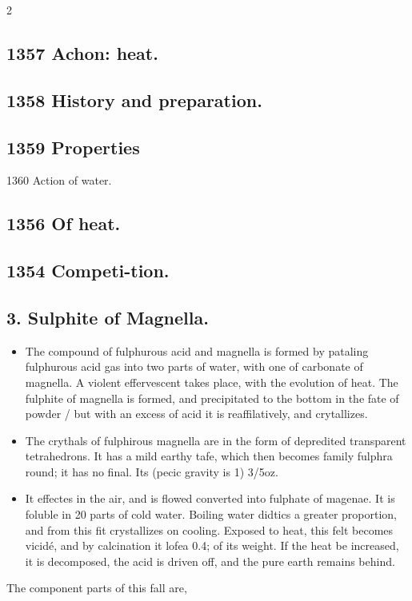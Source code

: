 \documentclass[10pt]{article}
\begin{document}
\begin{multicols}{2}
\subsection*{1357 Achon: heat.}
\subsection*{1358 History and preparation.}
\subsection*{1359 Properties}
1360 Action of water.

\subsection*{1356 Of heat.}
\subsection*{1354 Competi-tion.}
\subsection*{3. Sulphite of Magnella.}
\begin{itemize}\setlength{\itemsep}{1pt}
\item The compound of fulphurous acid and magnella is formed by pataling fulphurous acid gas into two parts of water, with one of carbonate of magnella. A violent effervescent takes place, with the evolution of heat. The fulphite of magnella is formed, and precipitated to the bottom in the fate of powder / but with an excess of acid it is reaffilatively, and crytallizes.
\item The crythals of fulphirous magnella are in the form of depredited transparent tetrahedrons. It has a mild earthy tafe, which then becomes family fulphra round; it has no final. Its (pecic gravity is 1) 3/5oz.
\item It effectes in the air, and is flowed converted into fulphate of magenae. It is foluble in 20 parts of cold water. Boiling water didtics a greater proportion, and from this fit crystallizes on cooling. Exposed to heat, this felt becomes vicidé, and by calcination it lofea 0.4; of its weight. If the heat be increased, it is decomposed, the acid is driven off, and the pure earth remains behind.
\end{itemize}
The component parts of this fall are,


\end{multicols}
\end{document}
